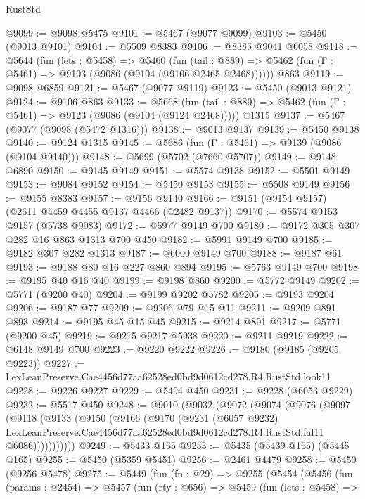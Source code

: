\begin{lexlean}{RustStd}
\begin{coremodule}
@9099 := @9098 @5475
@9101 := @5467 (@9077 @9099)
@9103 := @5450 (@9013 @9101)
@9104 := @5509 @8383
@9106 := @8385 @9041 @6058
@9118 := @5644
    (fun (lets : @5458) =>
    @5460
      (fun (tail : @889) => @5462 (fun (Γ : @5461) => @9103 (@9086 (@9104 (@9106 @2465 @2468))))))
    @863
@9119 := @9098 @6859
@9121 := @5467 (@9077 @9119)
@9123 := @5450 (@9013 @9121)
@9124 := @9106 @863
@9133 := @5668
    (fun (tail : @889) => @5462 (fun (Γ : @5461) => @9123 (@9086 (@9104 (@9124 @2468)))))
    @1315
@9137 := @5467 (@9077 (@9098 (@5472 @1316)))
@9138 := @9013 @9137
@9139 := @5450 @9138
@9140 := @9124 @1315
@9145 := @5686 (fun (Γ : @5461) => @9139 (@9086 (@9104 @9140)))
@9148 := @5699 (@5702 (@7660 @5707))
@9149 := @9148 @6890
@9150 := @9145 @9149
@9151 := @5574 @9138
@9152 := @5501 @9149
@9153 := @9084 @9152
@9154 := @5450 @9153
@9155 := @5508 @9149
@9156 := @9155 @8383
@9157 := @9156 @9140
@9166 := @9151 (@9154 @9157) (@2611 @4459 @4455 @9137 @4466 (@2482 @9137))
@9170 := @5574 @9153 @9157 (@5738 @9083)
@9172 := @5977 @9149 @700
@9180 := @9172 @305 @307 @282 @16 @863 @1313 @700 @450
@9182 := @5991 @9149 @700
@9185 := @9182 @307 @282 @1313
@9187 := @6000 @9149 @700
@9188 := @9187 @61
@9193 := @9188 @80 @16 @227 @860 @894
@9195 := @5763 @9149 @700
@9198 := @9195 @40 @16 @40
@9199 := @9198 @860
@9200 := @5772 @9149
@9202 := @5771 (@9200 @40)
@9204 := @9199 @9202 @5782
@9205 := @9193 @9204
@9206 := @9187 @77
@9209 := @9206 @79 @15 @11
@9211 := @9209 @891 @893
@9214 := @9195 @45 @15 @45
@9215 := @9214 @891
@9217 := @5771 (@9200 @45)
@9219 := @9215 @9217 @5938
@9220 := @9211 @9219
@9222 := @6148 @9149 @700
@9223 := @9220 @9222
@9226 := @9180 (@9185 (@9205 @9223))
@9227 := LexLeanPreserve.Cae4456d77aa62528ed0bd9d0612cd278.R4.RustStd.look11
@9228 := @9226 @9227
@9229 := @5494 @450
@9231 := @9228 (@6053 @9229)
@9232 := @5517 @450
@9248 := @9010
    (@9032
      (@9072
        (@9074
          (@9076
            (@9097
              (@9118
                (@9133
                  (@9150
                    (@9166
                      (@9170
                        (@9231
                          (@6057 @9232)
                          LexLeanPreserve.Cae4456d77aa62528ed0bd9d0612cd278.R4.RustStd.fal11
                          @6086)))))))))))
@9249 := @5433 @165
@9253 := @5435 (@5439 @165) (@5445 @165)
@9255 := @5450 (@5359 @5451)
@9256 := @2461 @4479
@9258 := @5450 (@9256 @5478)
@9275 := @5449
    (fun (fn : @29) =>
    @9255
      (@5454
        (@5456
          (fun (params : @2454) =>
          @5457
            (fun (rty : @656) =>
            @5459
              (fun (lets : @5458) =>

\end{coremodule}
\end{lexlean}
